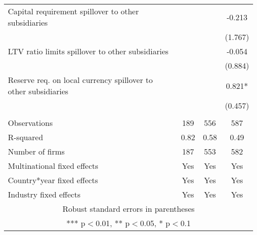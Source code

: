 \begin{tabular}{lccc}
Capital requirement spillover to other subsidiaries &  &  & -0.213 \\
 &  &  & (1.767) \\
LTV ratio limits spillover to other subsidiaries &  &  & -0.054 \\
 &  &  & (0.884) \\
Reserve req. on local currency spillover to other subsidiaries &  &  & 0.821* \\
 &  &  & (0.457) \\
 &  &  &  \\
Observations & 189 & 556 & 587 \\
R-squared & 0.82 & 0.58 & 0.49 \\
Number of firms & 187 & 553 & 582 \\
Multinational fixed effects & Yes & Yes & Yes \\
Country*year fixed effects & Yes & Yes & Yes \\
 Industry fixed effects & Yes & Yes & Yes \\ \hline
\multicolumn{4}{c}{ Robust standard errors in parentheses} \\
\multicolumn{4}{c}{ *** p$<$0.01, ** p$<$0.05, * p$<$0.1} \\
\end{tabular}
